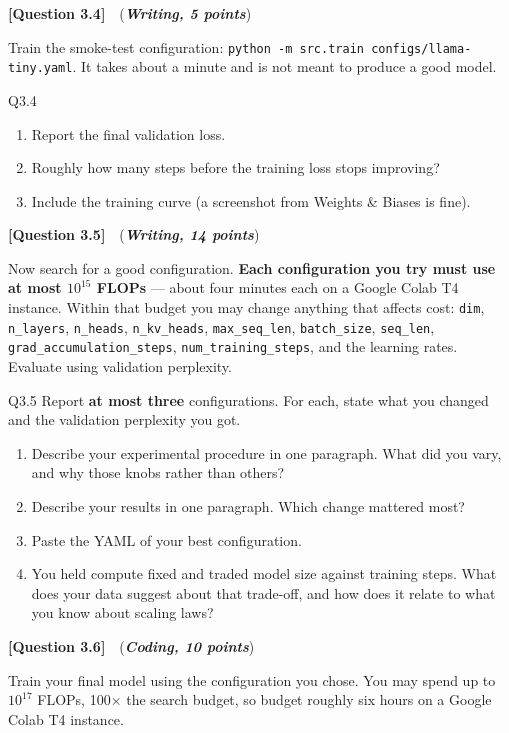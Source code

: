 \documentclass[11pt]{article}
\newcommand{\question}[3]{%
  \vspace{0.9em}
  \noindent\textbf{[Question #1]}\ \ (\textit{\textbf{#2, #3 points}})\quad
}
\begin{document}
\question{3.4}{Writing}{5}
Train the smoke-test configuration: \texttt{python -m src.train configs/llama-tiny.yaml}. It takes
about a minute and is not meant to produce a good model.

\begin{deliverables}{Q3.4}
\begin{enumerate}[label=\Alph*., leftmargin=1.6em]
  \item Report the final validation loss.
  \item Roughly how many steps before the training loss stops improving?
  \item Include the training curve (a screenshot from Weights \& Biases is fine).
\end{enumerate}
\end{deliverables}

\question{3.5}{Writing}{14}
Now search for a good configuration. \textbf{Each configuration you try must use at most $10^{15}$
FLOPs} --- about four minutes each on a Google Colab T4 instance. Within that budget you may change anything
that affects cost: \texttt{dim}, \texttt{n\_layers}, \texttt{n\_heads}, \texttt{n\_kv\_heads},
\texttt{max\_seq\_len}, \texttt{batch\_size}, \texttt{seq\_len},
\texttt{grad\_accumulation\_steps}, \texttt{num\_training\_steps}, and the learning rates. Evaluate
using validation perplexity.

\begin{deliverables}{Q3.5}
Report \textbf{at most three} configurations. For each, state what you changed and the validation
perplexity you got.
\begin{enumerate}[label=\Alph*., leftmargin=1.6em]
  \item Describe your experimental procedure in one paragraph. What did you vary, and why those
    knobs rather than others?
  \item Describe your results in one paragraph. Which change mattered most?
  \item Paste the YAML of your best configuration.
  \item You held compute fixed and traded model size against training steps. What does your data
    suggest about that trade-off, and how does it relate to what you know about scaling laws?
\end{enumerate}
\end{deliverables}

\question{3.6}{Coding}{10}
Train your final model using the configuration you chose. You may spend up to $10^{17}$ FLOPs,
100$\times$ the search budget, so budget roughly six hours on a Google Colab T4 instance.
\end{document}
